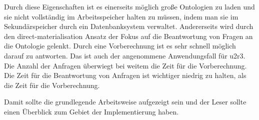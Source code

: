 Durch diese Eigenschaften ist es einerseits möglich große Ontologien zu laden und sie nicht vollständig im Arbeitsspeicher halten zu müssen, indem man sie im Sekundärspeicher durch ein Datenbanksystem verwaltet. Andererseits wird durch den direct-materialisation Ansatz der Fokus auf die Beantwortung von Fragen an die Ontologie gelenkt. Durch eine Vorberechnung ist es sehr schnell möglich darauf zu antworten. Das ist auch der angenommene Anwendungsfall für u2r3. Die Anzahl der Anfragen überwiegt bei weitem  die Zeit für die Vorberechnung. Die Zeit für die Beantwortung von Anfragen ist wichtiger niedrig zu halten, als die Zeit für die Vorberechnung.

Damit sollte die grundlegende Arbeitsweise aufgezeigt sein und der Leser sollte einen Überblick zum Gebiet der Implementierung haben.